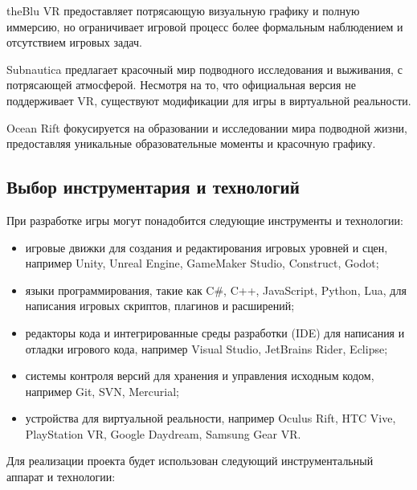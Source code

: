 \documentclass{../mirea-prog-lang}
\begin{document}
theBlu VR предоставляет потрясающую визуальную графику и полную иммерсию, но ограничивает игровой процесс более формальным наблюдением и отсутствием игровых задач.

Subnautica предлагает красочный мир подводного исследования и выживания, с потрясающей атмосферой. Несмотря на то, что официальная версия не поддерживает VR, существуют модификации для игры в виртуальной реальности.

Ocean Rift фокусируется на образовании и исследовании мира подводной жизни, предоставляя уникальные образовательные моменты и красочную графику.

\subsection{Выбор инструментария и технологий}

При разработке игры могут понадобится следующие инструменты и технологии:

\begin{itemize}
	\item игровые движки для создания и редактирования игровых уровней и сцен, например Unity, Unreal Engine, GameMaker Studio, Construct, Godot;
	\item языки программирования, такие как C\#, C++, JavaScript, Python, Lua, для написания игровых скриптов, плагинов и расширений;
	\item редакторы кода и интегрированные среды разработки (IDE) для написания и отладки игрового кода, например Visual Studio, JetBrains Rider, Eclipse;
	\item системы контроля версий для хранения и управления исходным кодом, например Git, SVN, Mercurial;
	\item устройства для виртуальной реальности, например Oculus Rift, HTC Vive, PlayStation VR, Google Daydream, Samsung Gear VR.
\end{itemize}

Для реализации проекта будет использован следующий инструментальный аппарат и технологии:
\end{document}
